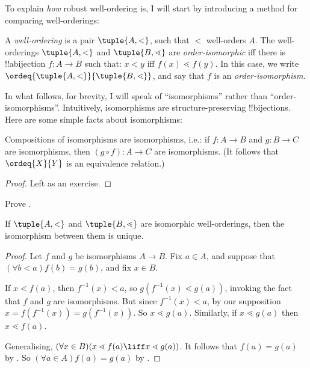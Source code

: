 \documentclass[../../../include/open-logic-section]{subfiles}
\begin{document}
To explain \emph{how} robust well-ordering is, I will start by introducing a method for comparing well-orderings: 
\begin{defn}
	A \emph{well-ordering} is a pair $\tuple{A, <}$, such that $<$ well-orders $A$. The well-orderings $\tuple{A, <}$ and $\tuple{B, \lessdot}$ are \emph{order-isomorphic} {iff} there is !!a{bijection} $f \colon A \to B$ such that: $x < y$ iff $f(x) \lessdot  f(y)$. In this case, we write $\ordeq{\tuple{A, <}}{\tuple{B, \lessdot}}$, and say that $f$ is an \emph{order-isomorphism}.
\end{defn}\noindent
In what follows, for brevity, I will speak of ``isomorphisms'' rather than ``order-isomorphisms''. Intuitively, isomorphisms are structure-preserving !!{bijection}s. Here are some simple facts about isomorphisms:
\begin{lem}
	Compositions of isomorphisms are isomorphisms, i.e.: if $f \colon A \to B$ and $g \colon B \to C$ are isomorphisms, then $(g \circ f) \colon A \to C$ are isomorphisms. (It follows that $\ordeq{X}{Y}$ is an equivalence relation.)
\end{lem}
\begin{proof}
	Left as an exercise.
\end{proof}
\begin{prob}
	Prove . %
\end{prob}
\begin{prop}
	If $\tuple{A, <}$ and $\tuple{B, \lessdot}$ are isomorphic well-orderings, then the isomorphism between them is unique.
\end{prop}
\begin{proof}
	Let $f$ and $g$ be isomorphisms $A \to B$. 
	Fix $a\in A$, and suppose that $(\forall b < a)f(b) = g(b)$, and fix $x \in B$. 
	
	If $x \lessdot f(a)$, then $f^{-1}(x) < a$, so $g(f^{-1}(x) \lessdot g(a))$, invoking the fact that $f$ and $g$ are isomorphisms. But since $f^{-1}(x) < a$, by our supposition $x =f(f^{-1}(x)) = g(f^{-1}(x))$. So $x \lessdot g(a)$. Similarly, if $x \lessdot g(a)$ then $x \lessdot f(a)$. 
	
	Generalising, $(\forall x \in B)(x \lessdot f(a) \liff x \lessdot g(a))$. It follows that $f(a) = g(a)$ by . So $(\forall a \in A)f(a) = g(a)$ by .
\end{proof}\noindent
\end{document}
